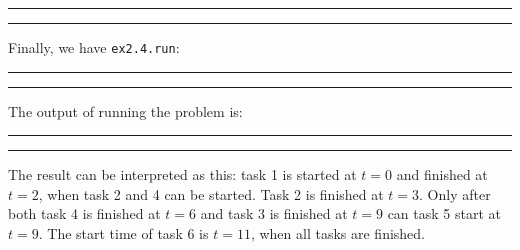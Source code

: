 \bigskip
\hrule
\small

\normalsize
\hrule
\bigskip

Finally, we have {\tt ex2.4.run}:

\bigskip
\hrule
\small

\normalsize
\hrule
\bigskip

The output of running the problem is:

\bigskip
\hrule
\small

\normalsize
\hrule
\bigskip

The result can be interpreted as this: task 1 is started at $t=0$ and finished at $t=2$, when task 2 and 4 can be started. Task 2 is finished at $t=3$. Only after both task 4 is finished at $t=6$ and task 3 is finished at $t=9$ can task 5 start at $t=9$. The start time of task 6 is $t=11$, when all tasks are finished.
